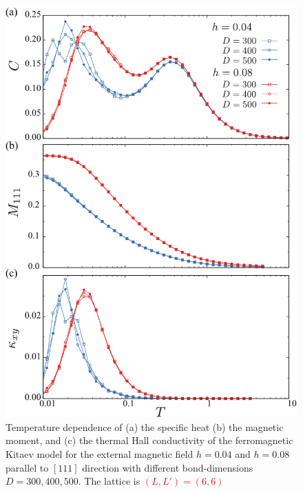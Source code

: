 \documentclass[reprint,amsmath,amssymb,aps,prx]{revtex4-2}
\newcommand{\red}[1]{\textcolor{red}{#1}}
\begin{document}
\begin{figure}
  \begin{center}
    \includegraphics[width=0.9\linewidth]{Figs/plot_CMk.pdf}
  \end{center}
  \caption{Temperature dependence of (a) the specific heat (b) the magnetic moment, and (c) the thermal Hall conductivity of the ferromagnetic Kitaev model for the external magnetic field $h=0.04$ and $h=0.08$ parallel to $[111]$ direction with different bond-dimensions $D=300, 400, 500$. The lattice is \red{$(L, L') = (6, 6)$}}
  \label{fig:CMk_XC6}
\end{figure}
\end{document}

